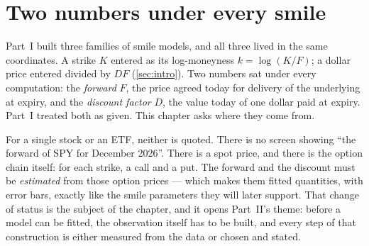 \section{Two numbers under every smile}
\label{sec:fwdtwo}

Part~I built three families of smile models, and all three lived in the
same coordinates.  A strike $K$ entered as its log-moneyness
$k=\log(K/F)$; a dollar price entered divided by $DF$
(\cref{sec:intro}).  Two numbers sat under every
computation: the \emph{forward} $F$, the price agreed today for
delivery of the underlying at expiry, and the \emph{discount factor}
$D$, the value today of one dollar paid at expiry.  Part~I treated
both as given.  This chapter asks where they come from.

For a single stock or an ETF, neither is
quoted.  There is no screen showing ``the forward of SPY for December
2026''.  There is a spot price, and there is the option chain itself:
for each strike, a call and a put.  The forward and the discount must
be \emph{estimated} from those option prices --- which makes them
fitted quantities, with error bars, exactly like the smile parameters
they will later support.  That change of status is the subject of the
chapter, and it opens Part~II's theme: before a model can be fitted,
the observation itself has to be built, and every step of that
construction is either measured from the data or chosen and stated.

